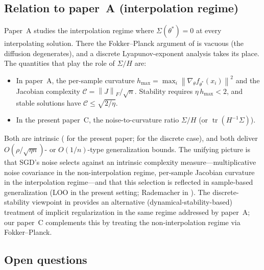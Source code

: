 \documentclass[11pt,a4paper]{article}
\theoremstyle{definition}
\theoremstyle{remark}
\DeclareMathOperator{\tr}{tr}
\newcommand{\norm}[1]{\left\|#1\right\|}
\begin{document}
\subsection{Relation to paper~A (interpolation regime)}

Paper~A \cite{paperA} studies the interpolation regime where
$\Sigma(\theta^*)=0$ at every interpolating solution.  There the
Fokker--Planck argument of  is vacuous (the diffusion
degenerates), and a discrete Lyapunov-exponent analysis takes its place.
The quantities that play the role of $\Sigma/H$ are:
\begin{itemize}
\item In paper~A, the per-sample curvature $h_{\max} = \max_i
   \norm{\nabla_\theta f_{\theta^*}(x_i)}^2$ and the Jacobian
   complexity $\mathcal{C} = \norm{J}_F/\sqrt n$.  Stability requires
   $\eta\,h_{\max} < 2$, and stable solutions have $\mathcal{C}\leq
   \sqrt{2/\eta}$.
\item In the present paper~C, the noise-to-curvature ratio $\Sigma/H$
   (or $\tr(H^{-1}\Sigma)$).
\end{itemize}
Both are intrinsic ( for the present paper;
\cite[Sec.~6]{paperA} for the discrete case), and both deliver
$O(\rho/\sqrt{\eta n})$- or $O(1/n)$-type generalization bounds.  The
unifying picture is that SGD's noise selects against an intrinsic
complexity measure---multiplicative noise covariance in the
non-interpolation regime, per-sample Jacobian curvature in the
interpolation regime---and that this selection is reflected in
sample-based generalization (LOO in the present setting; Rademacher in
\cite{paperA}).  The discrete-stability viewpoint in
\cite{WuSu2023} provides an alternative (dynamical-stability-based)
treatment of implicit regularization in the same regime addressed by
paper~A; our paper~C complements this by treating the
non-interpolation regime via Fokker--Planck.

\subsection{Open questions}
\end{document}
